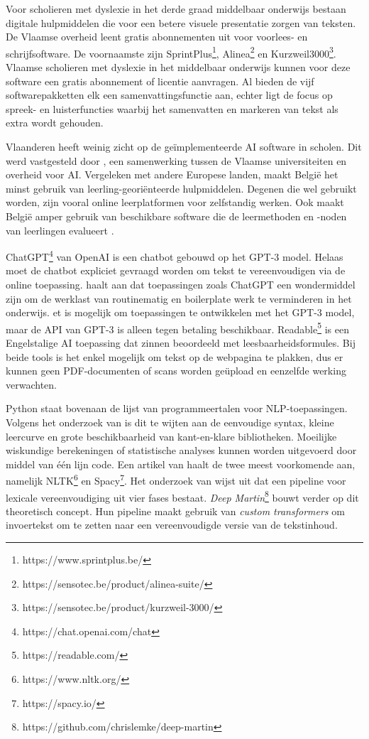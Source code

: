 Voor scholieren met dyslexie in het derde graad middelbaar onderwijs bestaan digitale hulpmiddelen die voor een betere visuele presentatie zorgen van teksten. De Vlaamse overheid leent gratis abonnementen uit voor voorlees- en schrijfsoftware. De voornaamste zijn SprintPlus\footnote{https://www.sprintplus.be/}, Alinea\footnote{https://sensotec.be/product/alinea-suite/} en Kurzweil3000\footnote{https://sensotec.be/product/kurzweil-3000/}. Vlaamse scholieren met dyslexie in het middelbaar onderwijs kunnen voor deze software een gratis abonnement of licentie aanvragen. Al bieden de vijf softwarepakketten elk een samenvattingsfunctie aan, echter ligt de focus op spreek- en luisterfuncties waarbij het samenvatten en markeren van tekst als extra wordt gehouden.

Vlaanderen heeft weinig zicht op de geïmplementeerde AI software in scholen. Dit werd vastgesteld door \autocite{Martens2021}, een samenwerking tussen de Vlaamse universiteiten en overheid voor AI. Vergeleken met andere Europese landen, maakt België het minst gebruik van leerling-georiënteerde hulpmiddelen. Degenen die wel gebruikt worden, zijn vooral online leerplatformen voor zelfstandig werken. Ook maakt België amper gebruik van beschikbare software die de leermethoden en -noden van leerlingen evalueert \autocite{Martens2021a}. 

ChatGPT\footnote{https://chat.openai.com/chat} van OpenAI is een chatbot gebouwd op het GPT-3 model. Helaas moet de chatbot expliciet gevraagd worden om tekst te vereenvoudigen via de online toepassing. \textcite{Verhoeven2023} haalt aan dat toepassingen zoals ChatGPT een wondermiddel zijn om de werklast van routinematig en boilerplate werk te verminderen in het onderwijs. et is mogelijk om toepassingen te ontwikkelen met het GPT-3 model, maar de API van GPT-3 is alleen tegen betaling beschikbaar. Readable\footnote{https://readable.com/} is een Engelstalige AI toepassing dat zinnen beoordeeld met leesbaarheidsformules. Bij beide tools is het enkel mogelijk om tekst op de webpagina te plakken, dus er kunnen geen PDF-documenten of scans worden geüpload en eenzelfde werking verwachten.


Python staat bovenaan de lijst van programmeertalen voor NLP-toepassingen. Volgens het onderzoek van \textcite{Thangarajah2019} is dit te wijten aan de eenvoudige syntax, kleine leercurve en grote beschikbaarheid van kant-en-klare bibliotheken. Moeilijke wiskundige berekeningen of statistische analyses kunnen worden uitgevoerd door middel van één lijn code. Een artikel van \textcite{Malik2022} haalt de twee meest voorkomende aan, namelijk NLTK\footnote{https://www.nltk.org/} en Spacy\footnote{https://spacy.io/}. Het onderzoek van \textcite{Shardlow2014} wijst uit dat een pipeline voor lexicale vereenvoudiging uit vier fases bestaat. \textit{Deep Martin}\footnote{https://github.com/chrislemke/deep-martin} bouwt verder op dit theoretisch concept. Hun pipeline maakt gebruik van \textit{custom transformers} om invoertekst om te zetten naar een vereenvoudigde versie van de tekstinhoud.

